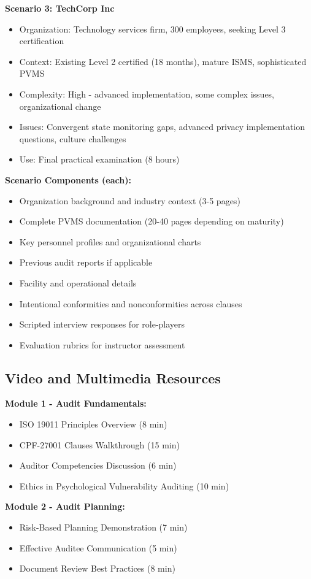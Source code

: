 \documentclass[11pt,a4paper]{article}
\begin{document}
\textbf{Scenario 3: TechCorp Inc}
\begin{itemize}
\item Organization: Technology services firm, 300 employees, seeking Level 3 certification
\item Context: Existing Level 2 certified (18 months), mature ISMS, sophisticated PVMS
\item Complexity: High - advanced implementation, some complex issues, organizational change
\item Issues: Convergent state monitoring gaps, advanced privacy implementation questions, culture challenges
\item Use: Final practical examination (8 hours)
\end{itemize}

\textbf{Scenario Components (each):}
\begin{itemize}
\item Organization background and industry context (3-5 pages)
\item Complete PVMS documentation (20-40 pages depending on maturity)
\item Key personnel profiles and organizational charts
\item Previous audit reports if applicable
\item Facility and operational details
\item Intentional conformities and nonconformities across clauses
\item Scripted interview responses for role-players
\item Evaluation rubrics for instructor assessment
\end{itemize}

\subsection{Video and Multimedia Resources}

\textbf{Module 1 - Audit Fundamentals:}
\begin{itemize}
\item ISO 19011 Principles Overview (8 min)
\item CPF-27001 Clauses Walkthrough (15 min)
\item Auditor Competencies Discussion (6 min)
\item Ethics in Psychological Vulnerability Auditing (10 min)
\end{itemize}

\textbf{Module 2 - Audit Planning:}
\begin{itemize}
\item Risk-Based Planning Demonstration (7 min)
\item Effective Auditee Communication (5 min)
\item Document Review Best Practices (8 min)
\end{itemize}
\end{document}
